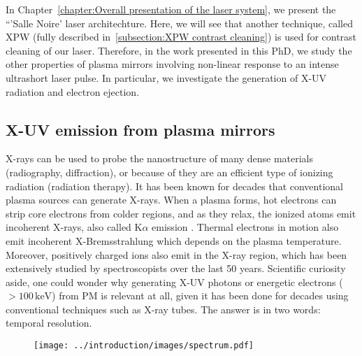 \noindent In Chapter~\ref{chapter:Overall presentation of the laser system}, we present the ``'Salle Noire' laser architechture. Here, we will see that another technique, called XPW (fully described in~\ref{subsection:XPW contrast cleaning}) is used for contrast cleaning of our laser. Therefore, in the work presented in this PhD, we study the other properties of plasma mirrors involving non-linear response to an intense ultrashort laser pulse. In particular, we investigate the generation of X-UV radiation and electron ejection.



\subsection{X-UV emission from plasma mirrors}
 
X-rays can be used to probe the nanostructure of many dense materials (radiography, diffraction), or because of they are an efficient type of ionizing radiation (radiation therapy). It has been known for decades that conventional plasma sources can generate X-rays. When a plasma forms, hot electrons can strip core electrons from colder regions, and as they relax, the ionized atoms emit incoherent X-rays, also called K$\alpha$ emission \cite{murnane1991ultrafast}. Thermal electrons in motion also emit incoherent X-Bremsstrahlung which depends on the plasma temperature. Moreover, positively charged ions also emit in the X-ray region, which has been extensively studied by spectroscopists over the last 50 years. Scientific curiosity aside, one could wonder why generating X-UV photons or energetic electrons ($>100\,\mathrm{keV}$) from PM is relevant at all, given it has been done for decades using conventional techniques such as X-ray tubes. The answer is in two words: temporal resolution.\\

\begin{figure}[H]
\begin{center}
\texttt{[image: ../introduction/images/spectrum.pdf]}
\end{center}
\end{figure}
%
%
%


